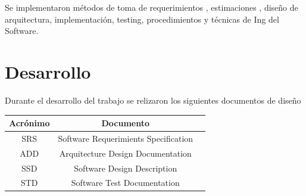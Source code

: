 \documentclass[a4paper,11pt]{book}
\begin{document}
Se implementaron métodos de toma de requerimientos , estimaciones ,
diseño de arquitectura, implementación, testing, procedimientos y técnicas
de Ing del Software.

\section{Desarrollo}
Durante el desarrollo del trabajo se relizaron los siguientes documentos de
diseño

\vspace{1cm}

\begin{table}[!h]
\begin{center}
\begin{tabular}{|c|c|c|}
\hline
\rowcolor[gray]{.8} Acrónimo & Documento \\
\hline
SRS & Software Requerimients Specification \\
\hline
ADD & Arquitecture Design Documentation \\
\hline
SSD & Software Design Description \\
\hline
STD & Software Test Documentation \\
\hline
\end{tabular}
\end{center}
\end{table}





\end{document}
